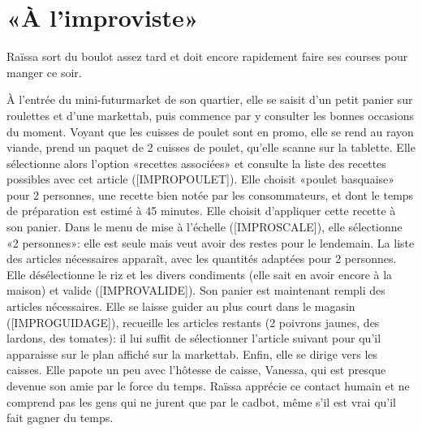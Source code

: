 \section{«À l'improviste»}

Raïssa sort du boulot assez tard et doit encore rapidement faire ses courses pour manger ce soir.
\par
À l'entrée du mini-futurmarket de son quartier, elle se saisit d'un petit panier sur roulettes et d'une markettab, puis commence par y consulter les bonnes occasions du moment.
Voyant que les cuisses de poulet sont en promo, elle se rend au rayon viande, prend un paquet de 2 cuisses de poulet, qu'elle scanne sur la tablette.
Elle sélectionne alors l'option «recettes associées» et consulte la liste des recettes possibles avec cet article ([IMPROPOULET]).
Elle choisit «poulet basquaise» pour 2 personnes, une recette bien notée par les consommateurs, et dont le temps de préparation est estimé à 45 minutes.
Elle choisit d'appliquer cette recette à son panier. 
Dans le menu de mise à l'échelle ([IMPROSCALE]), elle sélectionne «2 personnes»: elle est seule mais veut avoir des restes pour le lendemain.
La liste des articles nécessaires apparaît, avec les quantités adaptées pour 2 personnes.
Elle désélectionne le riz et les divers condiments (elle sait en avoir encore à la maison) et valide ([IMPROVALIDE]).
Son panier est maintenant rempli des articles nécessaires.
Elle se laisse guider au plus court dans le magasin ([IMPROGUIDAGE]), recueille les articles restants (2 poivrons jaunes, des lardons, des tomates): il lui suffit de sélectionner l'article suivant pour qu'il apparaisse sur le plan affiché sur la markettab.
Enfin, elle se dirige vers les caisses.
Elle papote un peu avec l'hôtesse de caisse, Vanessa, qui est presque devenue son amie par le force du temps. 
Raïssa apprécie ce contact humain et ne comprend pas les gens qui ne jurent que par le cadbot, même s'il est vrai qu'il fait gagner du temps.

